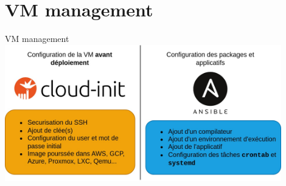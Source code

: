 \documentclass{beamer}
\begin{document}
    \section{VM management}\label{sec:vm-management}
    \begin{frame}{VM management}
        \bigbreak
        \centering
        \includegraphics[width=12cm]{image/cloud-init-vs-ansible}
    \end{frame}
\end{document}
